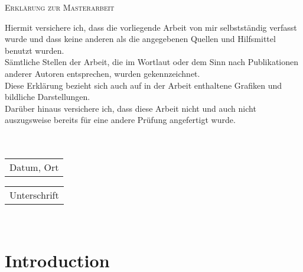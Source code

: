 \documentclass[11pt,titlepage]{article}
\theoremstyle{definition}
\theoremstyle{remark}
\begin{document}
	\thispagestyle{empty}
		\vspace*{1cm}
		\LARGE\textsc{Erklärung zur Masterarbeit}
		
		\vspace{1.5cm}
		
		\normalsize 
		Hiermit versichere ich, dass die vorliegende Arbeit von mir selbstständig verfasst wurde und dass keine anderen als die angegebenen Quellen und Hilfsmittel benutzt wurden.\\ Sämtliche Stellen der Arbeit, die im Wortlaut oder dem Sinn nach Publikationen anderer Autoren entsprechen, wurden gekennzeichnet.\\
		Diese Erklärung bezieht sich auch auf in der Arbeit enthaltene Grafiken und bildliche Darstellungen.\\
		Darüber hinaus versichere ich, dass diese Arbeit nicht und auch nicht auszugsweise bereits für eine andere Prüfung angefertigt wurde. 
		\ \\
		\ \\
		\ \\
		\begin{minipage}{0.57\textwidth}
			\begin{tabular}{@{}l@{}}\hline
				Datum, Ort \hspace{4.2cm}
			\end{tabular}
		\end{minipage}
		\hfill
		\begin{minipage}{0.43\textwidth} 
			\begin{tabular}{@{}l@{}}\hline
				Unterschrift \hspace{4.2cm}
			\end{tabular}
		\end{minipage}
		
	\newpage  \
	\thispagestyle{empty}
	
	\tableofcontents
	
	\newpage
	
	\setcounter{page}{1}
	
	\section*{Introduction}
	
\end{document}
